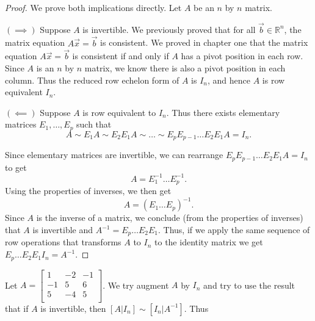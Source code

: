 \documentclass[12pt,letterpaper]{article}
\begin{document}
\begin{enumerate}
  \Answer 
  
  \begin{proof} We prove both implications directly. Let $A$ be an $n$ by $n$ matrix.
  	
  $(\implies)$ Suppose $A$ is invertible. We previously proved that for all $\vec{b}\in \mathbb{R}^n$, the matrix equation $A\vec{x}=\vec{b}$ is consistent. We proved in chapter one that the matrix equation $A\vec{x}=\vec{b}$ is consistent if and only if $A$ has a pivot position in each row. Since $A$ is an $n$ by $n$ matrix, we know there is also a pivot position in each column. Thus the reduced row echelon form of $A$ is $I_n$, and hence $A$ is row equivalent $I_n$.
  
  $(\impliedby)$ Suppose $A$ is row equivalent to $I_n$. Thus there exists elementary matrices $E_1, \dots, E_p$ such that $$A\sim E_1 A \sim E_2 E_1A \sim \dots \sim E_p E_{p-1}\dots E_2 E_1 A=I_n.$$ 
  
  Since elementary matrices are invertible, we can rearrange $E_p E_{p-1}\dots E_2 E_1 A=I_n$ to get $$A=E_1^{-1} \dots E_p^{-1}.$$ Using the properties of inverses, we then get $$A=(E_1 \dots E_p)^{-1}.$$ Since $A$ is the inverse of a matrix, we conclude (from the properties of inverses) that $A$ is invertible and $A^{-1}=E_p\dots E_2 E_1$. Thus, if we apply the same sequence of row operations that transforms $A$ to $I_n$ to the identity matrix we get $E_p\dots E_2 E_1 I_n=A^{-1}$.
  \end{proof}
  
  \Answer
  
 \begin{enumerate} 
  \Part Let $A=\begin{bmatrix}
  1 & -2 & -1\\
  -1 &5 & 6\\
  5 &-4 & 5\\
  \end{bmatrix}$. We try augment $A$ by $I_n$ and try to use the result that if $A$ is invertible, then $[A|I_n]\sim [I_n | A^{-1}]$. Thus
  

\end{enumerate}
\end{enumerate}
\end{document}
